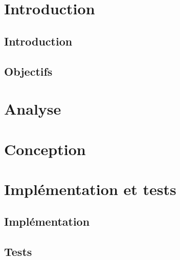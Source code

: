 \documentclass[a4paper,oneside,11pt]{book}
\begin{document}
\dominitoc %
{   
    \pagestyle{empty}

    
    \cleardoublepage

    
    \cleardoublepage
    
    
    \cleardoublepage

    \tableofcontents
    \cleardoublepage
}

\part{Introduction}
\setcounter{page}{1} %
\chapter{Introduction}
\myminitoc

 
\chapter{Objectifs}\label{chap:objectifs}
\myminitoc


\part{Analyse}
\label{chap:anal}
\myminitoc



\part{Conception}
\label{chap:conception}
\myminitoc


 
\part{Implémentation et tests}
 
\chapter{Implémentation}\label{chap:impl}
\myminitoc

\chapter{Tests}\label{chap:tests}
\myminitoc

\end{document}
